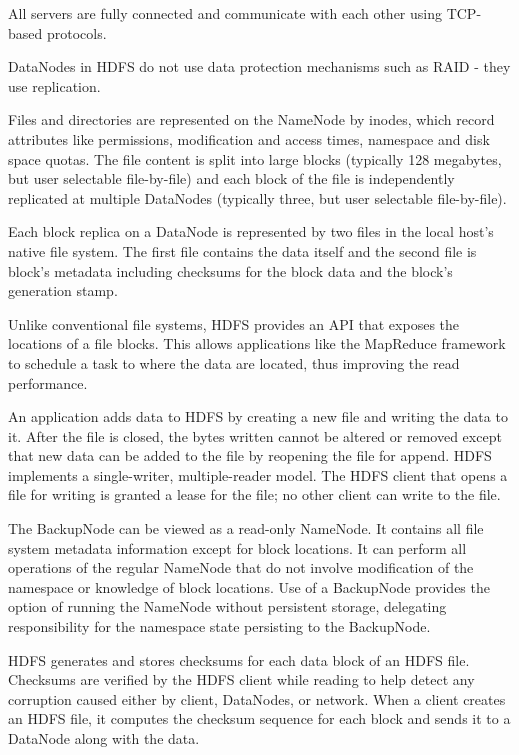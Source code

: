 \documentclass[11pt,oneside,a4paper]{article}
\begin{document}
\begin{compactitem}
	\item All servers are fully connected and communicate with each other using TCP-based protocols.
	\item DataNodes in HDFS do not use data protection mechanisms such as RAID - they use replication.
	\item Files and directories are represented on the NameNode by inodes, which record attributes like permissions, modification and access times, namespace and disk space quotas. The file content is split into large blocks (typically 128 megabytes, but user selectable file-by-file) and each block of the file is independently replicated at multiple DataNodes (typically three, but user selectable file-by-file).
	\item Each block replica on a DataNode is represented by two files in the local host’s native file system. The first file contains the data itself and the second file is block’s metadata including checksums for the block data and the block’s generation stamp.
	\item Unlike conventional file systems, HDFS provides an API that exposes the locations of a file blocks. This allows applications like the MapReduce framework to schedule a task to where the data are located, thus improving the read performance.
	\item An application adds data to HDFS by creating a new file and writing the data to it. After the file is closed, the bytes written cannot be altered or removed except that new data can be added to the file by reopening the file for append. HDFS implements a single-writer, multiple-reader model. The HDFS client that opens a file for writing is granted a lease for the file; no other client can write to the file. 
	\item The BackupNode can be viewed as a read-only NameNode. It contains all file system metadata information except for block locations. It can perform all operations of the regular NameNode that do not involve modification of the namespace or knowledge of block locations. Use of a BackupNode provides the option of running the NameNode without persistent storage, delegating responsibility for the namespace state persisting to the BackupNode.
	\item HDFS generates and stores	checksums for each data block of an HDFS file. Checksums are
	verified by the HDFS client while reading to help detect any corruption caused either by client, DataNodes, or network. When a client creates an HDFS file, it computes the checksum sequence for each block and sends it to a DataNode along with	the data.
\end{compactitem}
\end{document}
